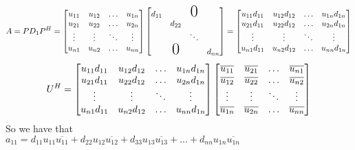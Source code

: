 \documentclass[letterpaper,12pt]{article}
\theoremstyle{definition}
\begin{document}
\[A = PD_1P^H = 
\begin{bmatrix}
u_{11} & u_{12}&\dots & u_{1n} \\
u_{21} & u_{22}&\dots & u_{2n}  \\
\vdots & \vdots &\ddots & \vdots \\
u_{n1} & u_{n2}&\dots & u_{nn}  \\
\end{bmatrix}
%
\begin{bmatrix}
d_{11} &              &\text{\huge0} &  \\
       & d_{22}       &              &  \\
       &              &\ddots        &  \\
       & \text{\huge0}&              & d_{nn}  \\
\end{bmatrix}
=
\begin{bmatrix}
u_{11}d_{11} & u_{12}d_{12}&\dots & u_{1n}d_{1n} \\
u_{21}d_{11} & u_{22}d_{12}&\dots & u_{2n}d_{1n}  \\
\vdots & \vdots &\ddots & \vdots \\
u_{n1}d_{11} & u_{n2}d_{12}&\dots & u_{nn}d_{1n}  \\
\end{bmatrix}
\]
\[U^H \\
=
\begin{bmatrix}
u_{11}d_{11} & u_{12}d_{12}&\dots & u_{1n}d_{1n} \\
u_{21}d_{11} & u_{22}d_{12}&\dots & u_{2n}d_{1n}  \\
\vdots & \vdots &\ddots & \vdots \\
u_{n1}d_{11} & u_{n2}d_{12}&\dots & u_{nn}d_{1n}  \\
\end{bmatrix}
%
\begin{bmatrix}
\overline{u_{11}} & \overline{u_{21}}&\dots  & \overline{u_{n1}} \\
\overline{u_{12}} & \overline{u_{22}}&\dots  & \overline{u_{n2}}  \\
\vdots            & \vdots           &\ddots & \vdots             \\
\overline{u_{1n}} & \overline{u_{2n}}&\dots  & \overline{u_{nn}}  \\
\end{bmatrix}
\]
So we have that\\
$a_{11} = d_{11}u_{11}\overline{u_{11}} + d_{22}u_{12}\overline{u_{12}} + d_{33}u_{13}\overline{u_{13}} + ... + d_{nn}u_{1n}\overline{u_{1n}}$\\
\end{document}
